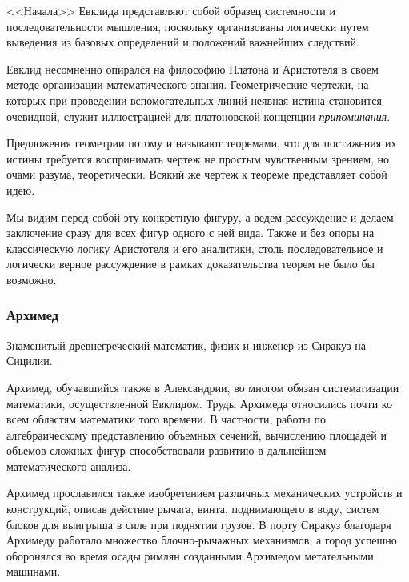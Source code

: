 
<<Начала>> Евклида представляют собой образец системности и последовательности мышления, поскольку организованы логически путем выведения из базовых определений и положений важнейших следствий. 

Евклид несомненно опирался на философию Платона и Аристотеля в своем методе организации математического знания. Геометрические чертежи, на которых при проведении вспомогательных линий неявная истина становится очевидной, служит иллюстрацией для платоновской концепции \textit{припоминания}. 

Предложения геометрии потому и называют теоремами, что для постижения их истины требуется воспринимать чертеж не простым чувственным зрением, но очами разума, теоретически. Всякий же чертеж к теореме представляет
собой идею. 

Мы видим перед собой эту конкретную фигуру, а ведем рассуждение и делаем заключение сразу для всех фигур одного с ней вида. Также и без опоры на классическую логику Аристотеля и его аналитики, столь последовательное и логически верное рассуждение в рамках доказательства теорем не было бы возможно.

\subsubsection{Архимед}
Знаменитый древнегреческий математик, физик и инженер из Сиракуз на Сицилии.

Архимед, обучавшийся также в Александрии, во многом обязан систематизации
математики, осуществленной Евклидом. Труды Архимеда относились почти ко всем
областям математики того времени. В частности, работы по алгебраическому представлению объемных сечений, вычислению площадей и объемов сложных фигур способствовали развитию в дальнейшем математического анализа. 

Архимед прославился также изобретением различных механических устройств и конструкций, описав действие рычага, винта, поднимающего в воду, систем блоков для выигрыша в силе при поднятии грузов. В порту Сиракуз благодаря Архимеду работало множество блочно-рычажных механизмов, а город успешно оборонялся во время осады римлян созданными Архимедом метательными машинами. 

